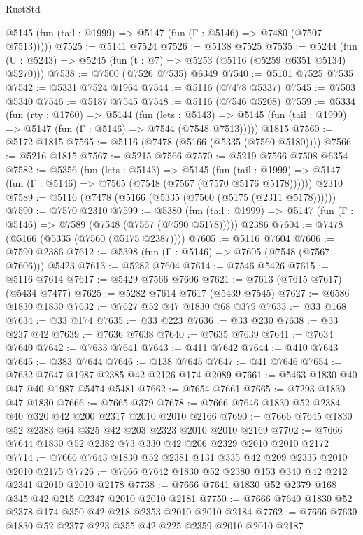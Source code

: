 \begin{lexlean}{RustStd}
\begin{coremodule}
      @5145 (fun (tail : @1999) => @5147 (fun (Γ : @5146) => @7480 (@7507 @7513)))))
@7525 := @5141 @7524
@7526 := @5138 @7525
@7535 := @5244 (fun (U : @5243) => @5245 (fun (t : @7) => @5253 (@5116 (@5259 @6351 @5134) @5270)))
@7538 := @7500 (@7526 @7535) @6349
@7540 := @5101 @7525 @7535
@7542 := @5331 @7524 @1964
@7544 := @5116 (@7478 @5337)
@7545 := @7503 @5340
@7546 := @5187 @7545
@7548 := @5116 (@7546 @5208)
@7559 := @5334
    (fun (rty : @1760) =>
    @5144
      (fun (lets : @5143) =>
      @5145 (fun (tail : @1999) => @5147 (fun (Γ : @5146) => @7544 (@7548 @7513)))))
    @1815
@7560 := @5172 @1815
@7565 := @5116 (@7478 (@5166 (@5335 (@7560 @5180))))
@7566 := @5216 @1815
@7567 := @5215 @7566
@7570 := @5219 @7566 @7508 @6354
@7582 := @5356
    (fun (lets : @5143) =>
    @5145
      (fun (tail : @1999) => @5147 (fun (Γ : @5146) => @7565 (@7548 (@7567 (@7570 @5176 @5178))))))
    @2310
@7589 := @5116 (@7478 (@5166 (@5335 (@7560 (@5175 (@2311 @5178))))))
@7590 := @7570 @2310
@7599 := @5380
    (fun (tail : @1999) => @5147 (fun (Γ : @5146) => @7589 (@7548 (@7567 (@7590 @5178)))))
    @2386
@7604 := @7478 (@5166 (@5335 (@7560 (@5175 @2387))))
@7605 := @5116 @7604
@7606 := @7590 @2386
@7612 := @5398 (fun (Γ : @5146) => @7605 (@7548 (@7567 @7606))) @5423
@7613 := @5282 @7604
@7614 := @7546 @5426
@7615 := @5116 @7614
@7617 := @5429 @7566 @7606
@7621 := @7613 (@7615 @7617) (@5434 @7477)
@7625 := @5282 @7614 @7617 (@5439 @7545)
@7627 := @6586 @1830 @1830
@7632 := @7627 @52 @47 @1830 @68 @379
@7633 := @33 @168
@7634 := @33 @174
@7635 := @33 @223
@7636 := @33 @230
@7638 := @33 @237 @42
@7639 := @7636 @7638
@7640 := @7635 @7639
@7641 := @7634 @7640
@7642 := @7633 @7641
@7643 := @411 @7642
@7644 := @410 @7643
@7645 := @383 @7644
@7646 := @138 @7645
@7647 := @41 @7646
@7654 := @7632 @7647 @1987 @2385 @42 @2126 @174 @2089
@7661 := @5463 @1830 @40 @47 @40 @1987 @5474 @5481
@7662 := @7654 @7661
@7665 := @7293 @1830 @47 @1830
@7666 := @7665 @379
@7678 := @7666 @7646 @1830 @52 @2384 @40 @320 @42 @200 @2317 @2010 @2010 @2166
@7690 := @7666 @7645 @1830 @52 @2383 @64 @325 @42 @203 @2323 @2010 @2010 @2169
@7702 := @7666 @7644 @1830 @52 @2382 @73 @330 @42 @206 @2329 @2010 @2010 @2172
@7714 := @7666 @7643 @1830 @52 @2381 @131 @335 @42 @209 @2335 @2010 @2010 @2175
@7726 := @7666 @7642 @1830 @52 @2380 @153 @340 @42 @212 @2341 @2010 @2010 @2178
@7738 := @7666 @7641 @1830 @52 @2379 @168 @345 @42 @215 @2347 @2010 @2010 @2181
@7750 := @7666 @7640 @1830 @52 @2378 @174 @350 @42 @218 @2353 @2010 @2010 @2184
@7762 := @7666 @7639 @1830 @52 @2377 @223 @355 @42 @225 @2359 @2010 @2010 @2187

\end{coremodule}
\end{lexlean}
